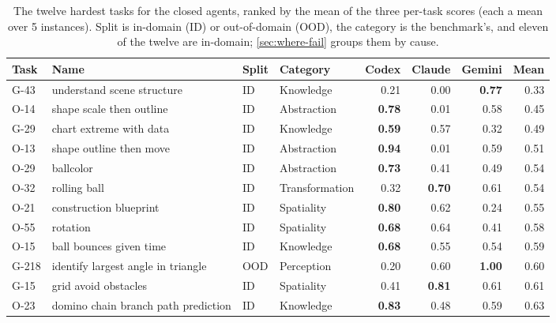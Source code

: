 \begin{table}[!t]
\centering
\caption{The twelve hardest tasks for the closed agents, ranked by the mean of the three per-task scores (each a mean over 5 instances). Split is in-domain (ID) or out-of-domain (OOD), the category is the benchmark's, and eleven of the twelve are in-domain; \cref{sec:where-fail} groups them by cause.}
\label{tab:hardest}
\small
\setlength{\tabcolsep}{4pt}
\begin{tabular}{llllrrrr}
\toprule
Task & Name & Split & Category & Codex & Claude & Gemini & Mean \\
\midrule
G-43 & understand scene structure & ID & Knowledge & 0.21 & 0.00 & \textbf{0.77} & 0.33 \\
O-14 & shape scale then outline & ID & Abstraction & \textbf{0.78} & 0.01 & 0.58 & 0.45 \\
G-29 & chart extreme with data & ID & Knowledge & \textbf{0.59} & 0.57 & 0.32 & 0.49 \\
O-13 & shape outline then move & ID & Abstraction & \textbf{0.94} & 0.01 & 0.59 & 0.51 \\
O-29 & ballcolor & ID & Abstraction & \textbf{0.73} & 0.41 & 0.49 & 0.54 \\
O-32 & rolling ball & ID & Transformation & 0.32 & \textbf{0.70} & 0.61 & 0.54 \\
O-21 & construction blueprint & ID & Spatiality & \textbf{0.80} & 0.62 & 0.24 & 0.55 \\
O-55 & rotation & ID & Spatiality & \textbf{0.68} & 0.64 & 0.41 & 0.58 \\
O-15 & ball bounces given time & ID & Knowledge & \textbf{0.68} & 0.55 & 0.54 & 0.59 \\
G-218 & identify largest angle in triangle & OOD & Perception & 0.20 & 0.60 & \textbf{1.00} & 0.60 \\
G-15 & grid avoid obstacles & ID & Spatiality & 0.41 & \textbf{0.81} & 0.61 & 0.61 \\
O-23 & domino chain branch path prediction & ID & Knowledge & \textbf{0.83} & 0.48 & 0.59 & 0.63 \\
\bottomrule
\end{tabular}
\end{table}
